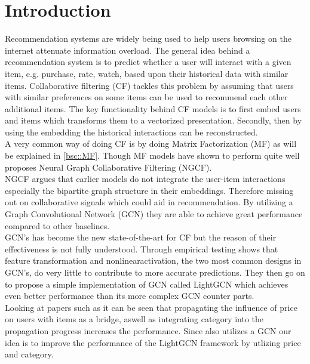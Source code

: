 \section{Introduction}
Recommendation systems are widely being used to help users browsing on the internet attenuate information overload\cite{YT_rec,Pint_rec}.
The general idea behind a recommendation system is to predict whether a user will interact with a given item, e.g. purchase, rate, watch, based upon their historical data with similar items.
Collaborative filtering (CF) tackles this problem by assuming that users with similar preferences on some items can be used to recommend each other additional items.
The key functionality behind CF models is to first embed users and items which transforms them to a vectorized presentation.
Secondly, then by using the embedding the historical interactions can be reconstructed.
\\
A very common way of doing CF is by doing Matrix Factorization (MF) as will be explained in \autoref{bsc::MF}.
Though MF models have shown to perform quite well \cite{NGCF_2019} proposes Neural Graph Collaborative Filtering (NGCF).
\\ 
NGCF argues that earlier models do not integrate the user-item interactions especially the bipartite graph structure in their embeddings.
Therefore missing out on collaborative signals which could aid in recommendation.
By utilizing a Graph Convolutional Network (GCN) they are able to achieve great performance compared to other baselines.
\\
GCN's has become the new state-of-the-art for CF but the reason of their effectiveness is not fully understood\cite{lightgcn}.
Through empirical testing \cite{lightgcn} shows that feature transformation and nonlinearactivation, the two most common designs in GCN's, do very little to contribute to more accurate predictions.
They then go on to propose a simple implementation of GCN called LightGCN which achieves even better performance than its more complex GCN counter parts.
\\
Looking at papers such as \cite{Priceaware} it can be seen that propagating the influence of price on users with items as a bridge, aswell as integrating category into the propagation progress increases the performance.
Since \cite{Priceaware} also utilizes a GCN our idea is to improve the performance of the LightGCN framework by utlizing price and category.
